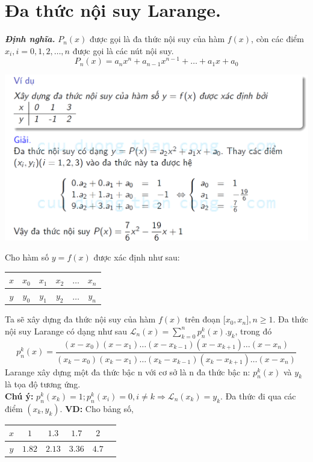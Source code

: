 \documentclass[12pt, a4paper]{report}
\def\DN{\textbf{\textit{Định nghĩa. }}}
\begin{document}
\section{Đa thức nội suy Larange.}
\DN $P_n (x)$ được gọi là đa thức nội suy của hàm $f(x)$, còn các điểm $x_i, i=0,1,2,\ldots,n$ được gọi là các nút nội suy. 
\[
    P_n(x) = a_n x^n + a_{n-1} x^{n-1} + \ldots + a_1 x + a_0    
\]
\begin{center}
    \includegraphics[scale = 0.45]{5.png}
\end{center}
Cho hàm số $y=f(x)$ được xác định như sau: 
\begin{table}[h]
\begin{tabular}{c|ccccc}
$x$ & $x_0$ & $x_1$ & $x_2$ & $\ldots$ & $x_n$ \\ \hline
$y$ & $y_0$ & $y_1$ & $y_2$ & $\ldots$ & $y_n$
\end{tabular}
\end{table}
Ta sẽ xây dựng đa thức nội suy của hàm $f(x)$ trên đoạn $\lbrack x_0,x_n \rbrack, n \geqslant 1$. Đa thức nội suy Larange có dạng như sau $\mathcal{L}_n (x) = \displaystyle \sum_{k=0}^{n} p^k_n (x).y_k$, trong đó
\[
    p^k_n (x) = \frac{(x-x_0)(x-x_1)\ldots(x-x_{k-1})(x-x_{k+1})\ldots (x-x_n)}{(x_k-x_0)(x_k-x_1)\ldots(x_k-x_{k-1})(x_k-x_{k+1})\ldots (x-x_n)}
\]
Larange xây dựng một đa thức bậc n với cơ sở là n đa thức bậc n: $p^k_n (x)$ và $y_k$ là tọa độ tương ứng.\\
\textbf{Chú ý:} $p^k_n (x_k) = 1; p^k_n (x_i) = 0, i \neq k \Rightarrow \mathcal{L}_n (x_k) = y_k$. Đa thức đi qua các điểm $(x_k,y_k)$.
\newpage
\textbf{VD:} Cho bảng số, \begin{table}[h]
    \begin{tabular}{c|ccccc}
    $x$ & $1$ & $1.3$ & $1.7$ & $2$  \\ \hline
    $y$ & $1.82$ & $2.13$ & $3.36$ & $4.7$
    \end{tabular}
    \end{table}
\end{document}
